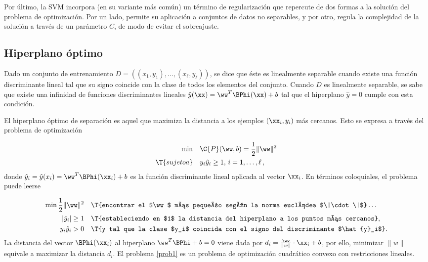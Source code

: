 Por último, la SVM incorpora (en su variante más común) un término de
regularización que repercute de dos formas a la solución del problema
de optimización. Por un lado, permite su aplicación a conjuntos de
datos no separables, y por otro, regula la complejidad
de la solución a través de un parámetro $C$, de modo de evitar el
sobreajuste.

\subsection{Hiperplano óptimo}
Dado un conjunto de entrenamiento
$D=\left((x_1,y_1),\ldots,(x_\ell,y_\ell)\right)$, se dice que éste es
linealmente separable cuando existe una función discriminante lineal
tal que su signo coincide con la clase de todos los elementos del
conjunto. Cuando $D$ es linealmente separable, se sabe que existe una
infinidad de funciones discriminantes lineales
$\hat{y}(\xx)=\ww^T\BPhi(\xx)+b$ tal que el hiperplano $\hat{y}=0$
cumple con esta condición.

El hiperplano óptimo de separación es aquel que maximiza la distancia
a los ejemplos $(\xx_i,y_i)$ más cercanos. Esto se expresa a través
del problema de optimización

\begin{align}
  \begin{split}
    \min\quad & \C{P}(\ww,b)=\frac{1}{2}\|\ww\|^2\\ \T{sujeto a}\quad
    & y_i\hat{y}_i\geq1,\,i=1,\ldots,\ell\,, 
  \end{split}
  \label{prob1}
\end{align}
donde $\hat{y}_i=\hat{y}(x_i)=\ww^T\BPhi(\xx_i)+b$ es la función
discriminante lineal aplicada al vector $\xx_i$. En términos
coloquiales, el problema puede leerse

\begin{align*}
  \begin{split}
    \min \frac{1}{2}\|\ww\|^2 \quad & \T{encontrar el $\ww$ más
      pequeño según la norma euclídea $\|\cdot\|$}\ldots\\
    |\hat{y}_i|\geq1 \quad & \T{estableciendo en $1$ la distancia del
      hiperplano a los puntos más cercanos},\\
    y_i\hat{y}_i>0\quad & \T{y tal que la clase $y_i$ coincida con el
      signo del discriminante $\hat{y}_i$}.
  \end{split}
\end{align*}
La distancia del vector $\BPhi(\xx_i)$ al hiperplano $\ww^T\BPhi+b=0$
viene dada por $d_i=\frac{\ww}{\|w\|}\cdot\xx_i+b$, por ello,
minimizar $\|w\|$ equivale a maximizar la distancia $d_i$.  El
problema \autoref{prob1} es un problema de optimización cuadrático convexo
con restricciones lineales.

